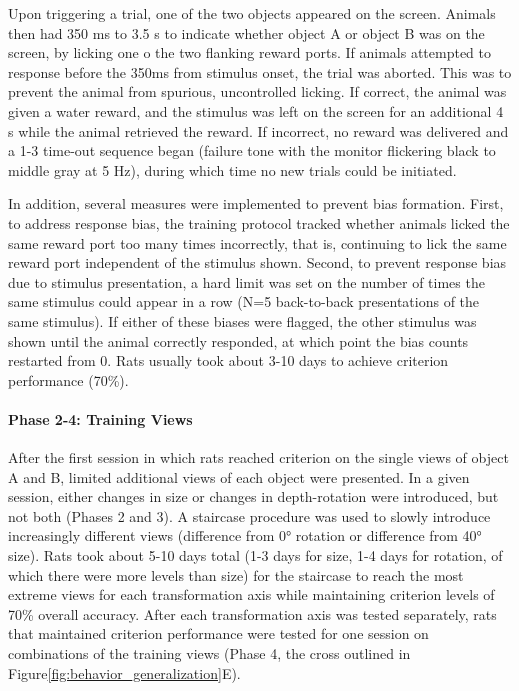 Upon triggering a trial, one of the two objects appeared on the screen. Animals then had 350 ms to 3.5 s to indicate whether object A or object B was on the screen, by licking one o the two flanking reward ports. If animals attempted to response before the 350ms from stimulus onset, the trial was aborted. This was to prevent the animal from spurious, uncontrolled licking. If correct, the animal was given a water reward, and the stimulus was left on the screen for an additional 4 s while the animal retrieved the reward. If incorrect, no reward was delivered and a 1-3 time-out sequence began (failure tone with the monitor flickering black to middle gray at 5 Hz), during which time no new trials could be initiated. 

In addition, several measures were implemented to prevent bias formation. First, to address response bias, the training protocol tracked whether animals licked the same reward port too many times incorrectly, that is, continuing to lick the same reward port independent of the stimulus shown. Second, to prevent response bias due to stimulus presentation, a hard limit was set on the number of times the same stimulus could appear in a row (N=5 back-to-back presentations of the same stimulus). If either of these biases were flagged, the other stimulus was shown until the animal correctly responded, at which point the bias counts restarted from 0. Rats usually took about 3-10 days to achieve criterion performance (70\%).  

\paragraph{Phase 2-4: Training Views}
After the first session in which rats reached criterion on the single views of object A and B, limited additional views of each object were presented. In a given session, either changes in size or changes in depth-rotation were introduced, but not both (Phases 2 and 3). A staircase procedure was used to slowly introduce increasingly different views (difference from \ang{0} rotation or difference from \ang{40} size). Rats took about 5-10 days total (1-3 days for size, 1-4 days for rotation, of which there were more levels than size) for the staircase to reach the most extreme views for each transformation axis while maintaining criterion levels of 70\% overall accuracy. After each transformation axis was tested separately, rats that maintained criterion performance were tested for one session on combinations of the training views (Phase 4, the cross outlined in Figure\ref{fig:behavior_generalization}E). 

